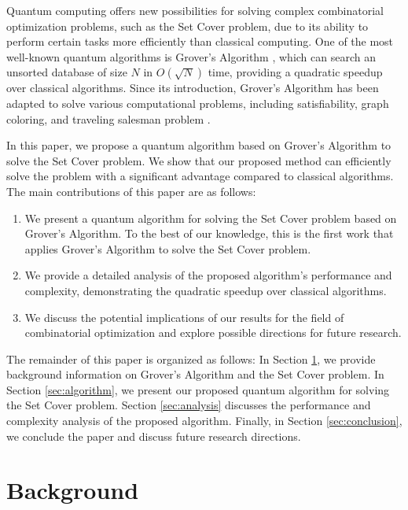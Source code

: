 Quantum computing offers new possibilities for solving complex combinatorial optimization problems, such as the Set Cover problem, due to its ability to perform certain tasks more efficiently than classical computing. One of the most well-known quantum algorithms is Grover's Algorithm \cite{Grover1996}, which can search an unsorted database of size $N$ in $O(\sqrt{N})$ time, providing a quadratic speedup over classical algorithms. Since its introduction, Grover's Algorithm has been adapted to solve various computational problems, including satisfiability, graph coloring, and traveling salesman problem \cite{Brassard1998, Shende2003, Montanaro2015}.

In this paper, we propose a quantum algorithm based on Grover's Algorithm to solve the Set Cover problem. We show that our proposed method can efficiently solve the problem with a significant advantage compared to classical algorithms. The main contributions of this paper are as follows:

\begin{enumerate}
    \item We present a quantum algorithm for solving the Set Cover problem based on Grover's Algorithm. To the best of our knowledge, this is the first work that applies Grover's Algorithm to solve the Set Cover problem.
    \item We provide a detailed analysis of the proposed algorithm's performance and complexity, demonstrating the quadratic speedup over classical algorithms.
    \item We discuss the potential implications of our results for the field of combinatorial optimization and explore possible directions for future research.
\end{enumerate}

The remainder of this paper is organized as follows: In Section \ref{sec:background}, we provide background information on Grover's Algorithm and the Set Cover problem. In Section \ref{sec:algorithm}, we present our proposed quantum algorithm for solving the Set Cover problem. Section \ref{sec:analysis} discusses the performance and complexity analysis of the proposed algorithm. Finally, in Section \ref{sec:conclusion}, we conclude the paper and discuss future research directions.

\section{Background}
\label{sec:background}

